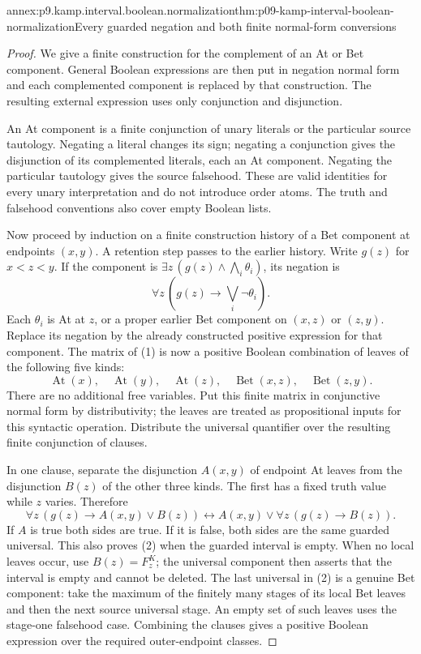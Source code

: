 \begin{annexitem}{annex:p9.kamp.interval.boolean.normalization}{thm:p09-kamp-interval-boolean-normalization}{Every guarded negation and both finite normal-form conversions}
\begin{proof}
We give a finite construction for the complement of an At or Bet
component. General Boolean expressions are then put in negation normal
form and each complemented component is replaced by that construction.
The resulting external expression uses only conjunction and disjunction.

An At component is a finite conjunction of unary literals or the
particular source tautology. Negating a literal changes its sign;
negating a conjunction gives the disjunction of its complemented
literals, each an At component. Negating the particular tautology
gives the source falsehood. These are valid identities for every
unary interpretation and do not introduce order atoms. The truth
and falsehood conventions also cover empty Boolean lists.

Now proceed by induction on a finite construction history of a Bet
component at endpoints \((x,y)\). A retention step passes to the
earlier history. Write \(g(z)\) for \(x<z<y\).
If the component is
\(\exists z\,(g(z)\land\bigwedge_i\theta_i)\), its negation is
\[
                  \forall z\,(g(z)\to\bigvee_i\neg\theta_i).
 \tag{1}
\]
Each \(\theta_i\) is At at \(z\), or a proper earlier
Bet component on \((x,z)\) or \((z,y)\). Replace its negation
by the already constructed positive expression for that component.
The matrix of (1) is now a positive Boolean combination of leaves of
the following five kinds:
\[
 \operatorname{At}(x),\quad\operatorname{At}(y),\quad
 \operatorname{At}(z),\quad\operatorname{Bet}(x,z),\quad
 \operatorname{Bet}(z,y).
\]
There are no additional free variables. Put this finite matrix in
conjunctive normal form by distributivity; the leaves are treated as
propositional inputs for this syntactic operation. Distribute the
universal quantifier over the resulting finite conjunction of clauses.

In one clause, separate the disjunction \(A(x,y)\) of endpoint
At leaves from the disjunction \(B(z)\) of the other three
kinds. The first has a fixed truth value while \(z\) varies.
Therefore
\[
 \forall z\,(g(z)\to A(x,y)\lor B(z))
 \longleftrightarrow A(x,y)\lor\forall z\,(g(z)\to B(z)).
 \tag{2}
\]
If \(A\) is true both sides are true. If it is false,
both sides are the same guarded universal. This also proves (2)
when the guarded interval is empty. When no local leaves occur,
use \(B(z)=F^K_z\); the universal component then asserts
that the interval is empty and cannot be deleted. The last
universal in (2) is a genuine Bet component: take the maximum
of the finitely many stages of its local Bet leaves and then
the next source universal stage. An empty set of such leaves
uses the stage-one falsehood case. Combining the clauses gives
a positive Boolean expression over the required outer-endpoint
classes.


\end{proof}
\end{annexitem}
